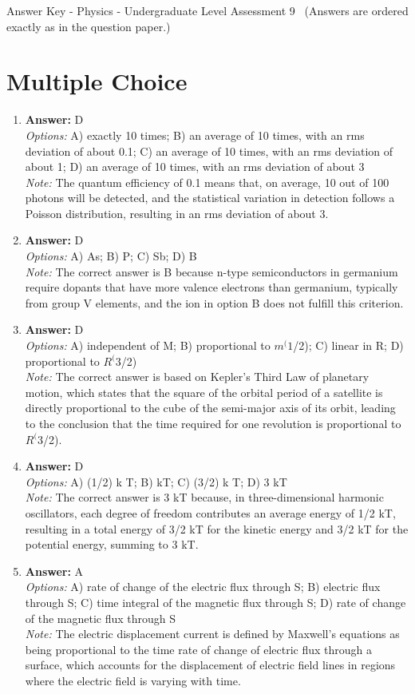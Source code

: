 \documentclass[12pt]{article}
\begin{document}
\begin{center}
Answer Key - Physics - Undergraduate Level Assessment 9 \
\small (Answers are ordered exactly as in the question paper.)
\end{center}

\section*{Multiple Choice}
\begin{enumerate}[label=\arabic*.]
\item \textbf{Answer:} D
\\ \textit{Options:} A) exactly 10 times; B) an average of 10 times, with an rms deviation of about 0.1; C) an average of 10 times, with an rms deviation of about 1; D) an average of 10 times, with an rms deviation of about 3
\\ \textit{Note:} The quantum efficiency of 0.1 means that, on average, 10 out of 100 photons will be detected, and the statistical variation in detection follows a Poisson distribution, resulting in an rms deviation of about 3.
\item \textbf{Answer:} D
\\ \textit{Options:} A) As; B) P; C) Sb; D) B
\\ \textit{Note:} The correct answer is B because n-type semiconductors in germanium require dopants that have more valence electrons than germanium, typically from group V elements, and the ion in option B does not fulfill this criterion.
\item \textbf{Answer:} D
\\ \textit{Options:} A) independent of M; B) proportional to $m^(1$/2); C) linear in R; D) proportional to $R^(3$/2)
\\ \textit{Note:} The correct answer is based on Kepler's Third Law of planetary motion, which states that the square of the orbital period of a satellite is directly proportional to the cube of the semi-major axis of its orbit, leading to the conclusion that the time required for one revolution is proportional to $R^(3$/2).
\item \textbf{Answer:} D
\\ \textit{Options:} A) (1/2) k T; B) kT; C) (3/2) k T; D) 3 kT
\\ \textit{Note:} The correct answer is 3 kT because, in three-dimensional harmonic oscillators, each degree of freedom contributes an average energy of 1/2 kT, resulting in a total energy of 3/2 kT for the kinetic energy and 3/2 kT for the potential energy, summing to 3 kT.
\item \textbf{Answer:} A
\\ \textit{Options:} A) rate of change of the electric flux through S; B) electric flux through S; C) time integral of the magnetic flux through S; D) rate of change of the magnetic flux through S
\\ \textit{Note:} The electric displacement current is defined by Maxwell's equations as being proportional to the time rate of change of electric flux through a surface, which accounts for the displacement of electric field lines in regions where the electric field is varying with time.
\end{enumerate}
\end{document}
